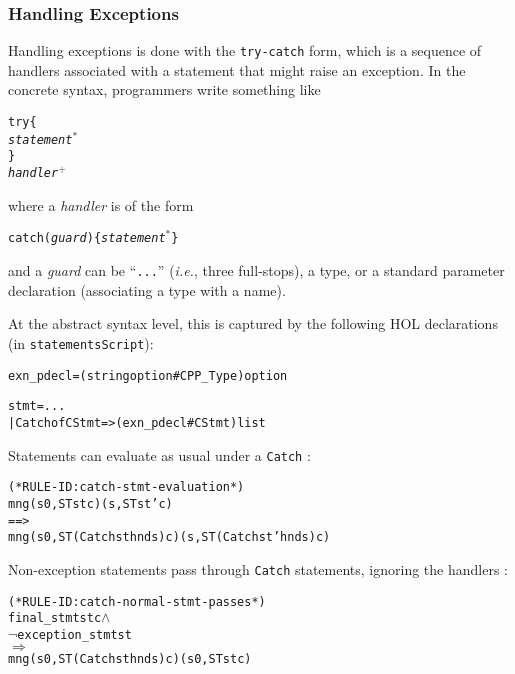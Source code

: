 \documentclass[11pt]{article}
\newcommand{\ie}{\emph{i.e.}}
\begin{document}
\subsubsection{Handling Exceptions}

Handling exceptions is done with the \texttt{try-catch} form, which is a
sequence of handlers associated with a statement that might raise an
exception.  In the concrete syntax, programmers write something like
\newcommand{\suplus}{\ensuremath{^+}}
\newcommand{\sustar}{\ensuremath{^*}}
\begin{alltt}
   try \{
     \emph{statement}\sustar
   \}
   \emph{handler}\suplus
\end{alltt}
where a \emph{handler} is of the form
\begin{alltt}
   catch (\emph{guard}) \{ \emph{statement}\sustar \}
\end{alltt}
and a \emph{guard} can be ``\texttt{...}'' (\ie, three full-stops), a
type, or a standard parameter declaration (associating a type with a
name).

At the abstract syntax level, this is captured by the following HOL
declarations (in \texttt{statementsScript}):
\begin{alltt}
   exn_pdecl = (string option # CPP_Type) option

   stmt = ...
        | Catch of CStmt => (exn_pdecl # CStmt) list
\end{alltt}

\bigskip
\noindent
Statements can evaluate as usual under a \texttt{Catch}
:
\begin{center}
\begin{minipage}{\textwidth}
%
%
\begin{alltt}
(* RULE-ID: catch-stmt-evaluation *)
     mng (s0, ST st c) (s, ST st' c)
   ==>
     mng (s0, ST (Catch st hnds) c) (s, ST (Catch st' hnds) c)
\end{alltt}
\end{minipage}
\end{center}
Non-exception statements pass through \texttt{Catch} statements,
ignoring the handlers :
\begin{center}
\begin{minipage}{\textwidth}
%
\begin{alltt}
(* RULE-ID: catch-normal-stmt-passes *)
     final_stmt st c \(\land\)
     \(\neg\)exception_stmt st
   \(\Rightarrow\)
     mng (s0, ST (Catch st hnds) c) (s0, ST st c)
\end{alltt}
\end{minipage}
\end{center}
\end{document}
